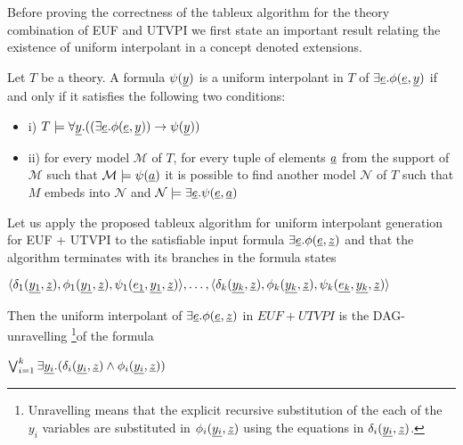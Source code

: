 Before proving the correctness of the tableux algorithm 
for the theory combination of EUF and UTVPI we first state
an important result relating the existence of uniform 
interpolant in a concept denoted extensions.

\begin{lemma} \cite{10.1007/978-3-030-29436-6_9} \label{cover_extension_lemma}
  Let $T$ be a theory. 
  A formula $\psi(\underline{y})$ is a uniform interpolant
  in $T$ of $\exists \underline{e} . \phi (\underline{e}, \underline{y})$
  if and only if it satisfies the following two conditions:

  \begin{itemize}
    \item[] i) $T \models \forall \underline{y}. ((\exists \underline{e} . 
    \phi(\underline{e}, \underline{y})) \rightarrow \psi(\underline{y}))$
  \item[] ii) for every model $\mathcal{M}$ of $T$, for every
  tuple of elements $\underline{a}$ from the support of $\mathcal{M}$
  such that $\mathcal{M} \models \psi(\underline{a})$ it is 
  possible to find another model $\mathcal{N}$ of $T$
  such that $M$ embeds into $\mathcal{N}$ and $\mathcal{N}
  \models \exists \underline{e} . \psi (\underline{e}, \underline{a})$
  \end{itemize}
\end{lemma}

\begin{theorem}
  Let us apply the proposed tableux algorithm 
  for uniform interpolant generation for EUF + UTVPI to the
  satisfiable input formula 
  $\exists \underline{e}. \phi(\underline{e}, \underline{z})$ and
  that the algorithm terminates with its branches in the
  formula states

  $\langle 
  \delta_1(\underline{y_1}, \underline{z}), 
  \phi_1(\underline{y_1}, \underline{z}),
  \psi_1(\underline{e_1}, \underline{y_1}, \underline{z})
  \rangle, \dots, \langle 
  \delta_k(\underline{y_k}, \underline{z}), 
  \phi_k(\underline{y_k}, \underline{z}),
  \psi_k(\underline{e_k}, \underline{y_k}, \underline{z})
  \rangle$

  Then the uniform interpolant of $\exists \underline{e} . \phi(\underline{e},
\underline{z})$ in $EUF + UTVPI$ is the DAG-unravelling \footnote{
  Unravelling means that the explicit recursive 
  substitution of the each of the $y_i$
  variables are substituted in $\phi_i(\underline{y_i}, \underline{z})$ using
  the equations in $\delta_i(\underline{y_i}, \underline{z})$.
}of the formula 

$\bigvee_{i=1}^k \exists \underline{y_i} . (\delta_i(\underline{y_i}, \underline{z}) \land \phi_i(\underline{y_i}, \underline{z}))$

\end{theorem}

